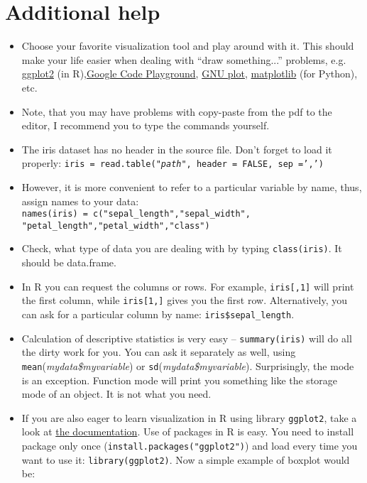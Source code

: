 \documentclass{article}
\begin{document}
\section*{Additional help}
\begin{itemize}
\item Choose your favorite visualization tool and play around with it. This should make your life easier when dealing with ``draw something...'' problems, e.g. \href{http://docs.ggplot2.org/current/}{ggplot2} (in R),\href{https://code.google.com/apis/ajax/playground/?type=visualization#motion_chart}{Google Code Playground}, \href{http://www.gnuplot.info/}{GNU plot}, \href{http://matplotlib.org/}{matplotlib} (for Python), etc.
\item Note, that you may have problems with copy-paste from the pdf to the editor, I recommend you to type the commands yourself. 
\item The iris dataset has no header in the source file. Don't forget to load it properly: \texttt{iris = read.table(\emph{"path"}, header = FALSE, sep =',')}
\item However, it is more convenient to refer to a particular variable by name, thus, assign names to your data:\\
\texttt{names(iris) = c("sepal\_length","sepal\_width",\\"petal\_length","petal\_width","class")} 
\item Check, what type of data you are dealing with by typing \texttt{class(iris)}. It should be data.frame.
\item In R you can request the columns or rows. For example, \texttt{iris[,1]} will print the first column, while \texttt{iris[1,]} gives you the first row. Alternatively, you can ask for a particular column by name: \texttt{iris\$sepal\_length}.
\item Calculation of descriptive statistics is very easy -- \texttt{summary(iris)} will do all the dirty work for you. You can ask it separately as well, using \texttt{mean}(\emph{mydata\$myvariable}) or \texttt{sd}(\emph{mydata\$myvariable}). Surprisingly, the mode is an exception. Function mode will print you something like the storage mode of an object. It is not what you need.
\item If you are also eager to learn  visualization in R using library \texttt{ggplot2}, take a look at \href{http://docs.ggplot2.org/current/}{the documentation}. Use of packages in R is easy. You need to install package only once (\texttt{install.packages("ggplot2")}) and load every time you want to use it: \texttt{library(ggplot2)}. Now a simple example of boxplot would be:

\end{itemize}
\end{document}
